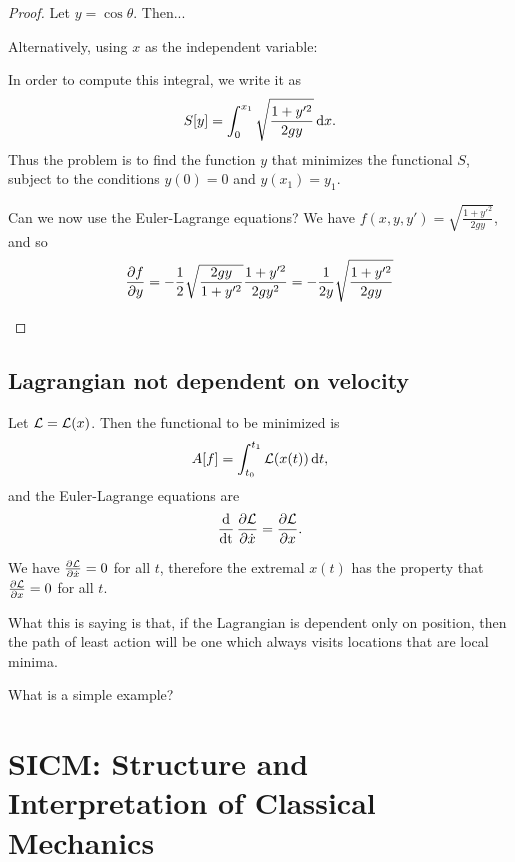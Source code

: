 \begin{proof}
  Let $y = \cos \theta$. Then...


  Alternatively, using $x$ as the independent variable:
  \begin{mdframed}
    In order to compute this integral, we write it as
    \begin{align*}
    S[y] = \int_{0}^{x_1} \sqrt{\frac{1 + y'^2}{2gy}}\dx.
  \end{align*}
  Thus the problem is to find the function $y$ that minimizes the functional $S$, subject to the
  conditions $y(0) = 0$ and $y(x_1) = y_1$.

  Can we now use the Euler-Lagrange equations? We have $f(x, y, y') = \sqrt{\frac{1 + y'^2}{2gy}}$, and so
  \begin{align*}
    \frac{\partial f}{\partial y} = -\frac{1}{2}\sqrt{\frac{2gy}{1 + y'^2}}\frac{1 + y'^2}{2gy^2} = -\frac{1}{2y}\sqrt{\frac{1 + y'^2}{2gy}}
  \end{align*}
\end{mdframed}

\end{proof}






\subsection{Lagrangian not dependent on velocity}

Let $\mathcal{L} = \mathcal{L}(x)$. Then the functional to be minimized is
\begin{align*}
  A[f] = \int_{t_{0}}^{t_{1}} \Lag(x(t)) \dt,
\end{align*}
and the Euler-Lagrange equations are
\begin{align*}
  \operatorname{\frac{\text{d}}{\text{dt}}} \frac{\partial \mathcal{L}}{\partial \dot{x}} = \frac{\partial \mathcal{L}}{\partial x}.
\end{align*}

We have $\frac{\partial \mathcal{L}}{\partial \dot{x}} = 0$ for all $t$, therefore the extremal $x(t)$ has the property that $\frac{\partial \mathcal{L}}{\partial x} = 0$ for all $t$.

What this is saying is that, if the Lagrangian is dependent only on position, then the path of least action
will be one which always visits locations that are local minima.

What is a simple example?



\section{SICM: Structure and Interpretation of Classical Mechanics}

